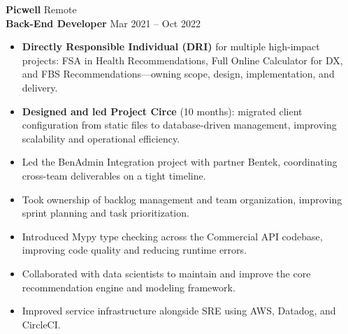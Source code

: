 \documentclass[11pt,letterpaper]{article}
\begin{document}
                                                                            \textbf{\large Picwell} \hfill Remote \\
                                                                            \textbf{Back-End Developer} \hfill Mar 2021 -- Oct 2022
                                                                            \begin{itemize}
                                                                                \item \textbf{Directly Responsible Individual (DRI)} for multiple high-impact projects: FSA in Health Recommendations, Full Online Calculator for DX, and FBS Recommendations---owning scope, design, implementation, and delivery.
                                                                                    \item \textbf{Designed and led Project Circe} (10 months): migrated client configuration from static files to database-driven management, improving scalability and operational efficiency.
                                                                                        \item Led the BenAdmin Integration project with partner Bentek, coordinating cross-team deliverables on a tight timeline.
                                                                                            \item Took ownership of backlog management and team organization, improving sprint planning and task prioritization.
                                                                                                \item Introduced Mypy type checking across the Commercial API codebase, improving code quality and reducing runtime errors.
                                                                                                    \item Collaborated with data scientists to maintain and improve the core recommendation engine and modeling framework.
                                                                                                        \item Improved service infrastructure alongside SRE using AWS, Datadog, and CircleCI.
                                                                                                        \end{itemize}
                                                                                                        
\end{document}
